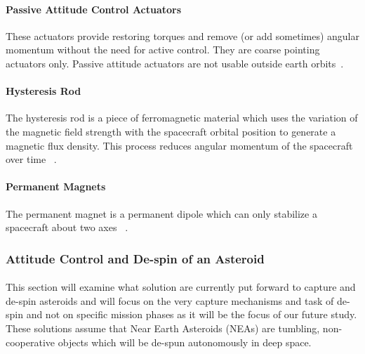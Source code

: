 \paragraph{Passive Attitude Control Actuators}These actuators provide restoring torques and remove (or add sometimes) angular momentum without the need for active control. They are coarse pointing actuators only. Passive attitude actuators are not usable outside earth orbits~\cite{Lukaszynski2013}.
\paragraph{Hysteresis Rod}The hysteresis rod is a piece of ferromagnetic material which uses the variation of the magnetic field strength with the spacecraft orbital position to generate a magnetic flux density. This process reduces angular momentum of the spacecraft over time ~\cite{Lukaszynski2013}. 
\paragraph{Permanent Magnets}The permanent magnet is a permanent dipole which can only stabilize a spacecraft about two axes ~\cite{Lukaszynski2013}.

\subsubsection{Attitude Control and De-spin of an Asteroid}
\paragraph{}	This section will examine what solution are currently put forward to capture and de-spin asteroids and will focus on the very capture mechanisms and task of de-spin and not on specific mission phases as it will be the focus of our future study. These solutions assume that Near Earth Asteroids (NEAs) are tumbling, non-cooperative objects which will be de-spun autonomously in deep space. 
